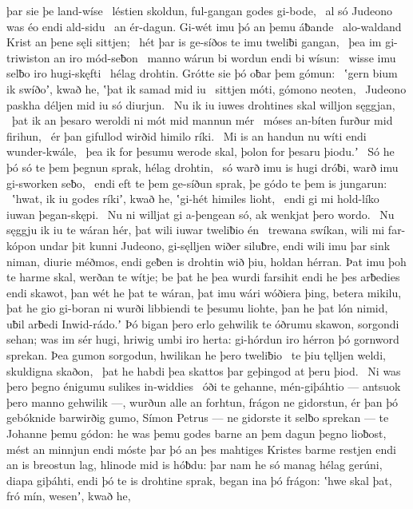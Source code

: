 þar sie þe land-wíse \hld\ léstien skoldun,
ful-gangan godes gi-bode, \hld\ al só Judeono was
éo endi ald-sidu \hld\ an ér-dagun.
Gi-wét imu þó an þemu áƀande \hld\ alo-waldand Krist
an þene sęli sittjen; \hld\ hét þar is ge-síðos te imu
tweliƀi gangan, \hld\ þea im gi-triwiston
an iro mód-seƀon \hld\ manno wárun
bi wordun endi bi wísun: \hld\ wisse imu selƀo
iro hugi-skęfti \hld\ hélag drohtin.
Grótte sie þó oƀar þem gómun: \hld\ ʽgern bium ik swíðoʼ, kwað he,
ʽþat ik samad mid iu \hld\ sittjen móti,
gómono neoten, \hld\ Judeono paskha
déljen mid iu só diurjun. \hld\ Nu ik iu iuwes drohtines skal
willjon sęggjan, \hld\ þat ik an þesaro weroldi ni mót
mid mannun mér \hld\ móses an-bíten
furður mid firihun, \hld\ ér þan gifullod wirðid
himilo ríki. \hld\ Mi is an handun nu
wíti endi wunder-kwále, \hld\ þea ik for þesumu werode skal,
þolon for þesaru þiodu.ʼ \hld\ Só he þó só te þem þegnun sprak,
hélag drohtin, \hld\ só warð imu is hugi dróƀi,
warð imu gi-sworken seƀo, \hld\ endi eft te þem ge-síðun sprak,
þe gódo te þem is jungarun: \hld\ ʽhwat, ik iu godes ríkiʼ, kwað he,
ʽgi-hét himiles lioht, \hld\ endi gi mi hold-líko
iuwan þegan-skępi. \hld\ Nu ni willjat gi a-þengean só,
ak wenkjat þero wordo. \hld\ Nu sęggju ik iu te wáran hér,
þat wili iuwar tweliƀio én \hld\ trewana swíkan,
wili mi far-kópon undar þit kunni Judeono,
gi-sęlljen wiðer siluƀre, endi wili imu þar sink niman,
diurie méðmos, endi geƀen is drohtin wið þiu,
holdan hérran. Þat imu þoh te harme skal,
werðan te wítje; be þat he þea wurdi farsihit
endi he þes arƀedies endi skawot,
þan wét he þat te wáran, þat imu wári wóðiera þing,
betera mikilu, þat he gio gi-boran ni wurði
libbiendi te þesumu liohte, þan he þat lón nimid,
uƀil arƀedi Inwid-rádo.ʼ
Þó bigan þero erlo gehwilik te óðrumu skawon,
sorgondi sehan; was im sér hugi,
hriwig umbi iro herta: gi-hórdun iro hérron þó
gornword sprekan. Þea gumon sorgodun,
hwilikan he þero tweliƀio \hld\ te þiu tęlljen weldi,
skuldigna skaðon, \hld\ þat he habdi þea skattos þar
geþingod at þeru þiod. \hld\ Ni was þero þegno énigumu
sulikes in-widdies \hld\ óði te gehanne,
mén-giþáhtio — antsuok þero manno gehwilik —,
wurðun alle an forhtun, frágon ne gidorstun,
ér þan þó gebóknide barwirðig gumo,
Símon Petrus — ne gidorste it selƀo sprekan —
te Johanne þemu gódon: he was þemu godes barne
an þem dagun þegno lioƀost,
mést an minnjun endi móste þar þó an þes mahtiges Kristes
barme restjen endi an is breostun lag,
hlinode mid is hóƀdu: þar nam he só manag hélag gerúni,
diapa giþáhti, endi þó te is drohtine sprak,
began ina þó frágon: ʽhwe skal þat, fró mín, wesenʼ, kwað he,
